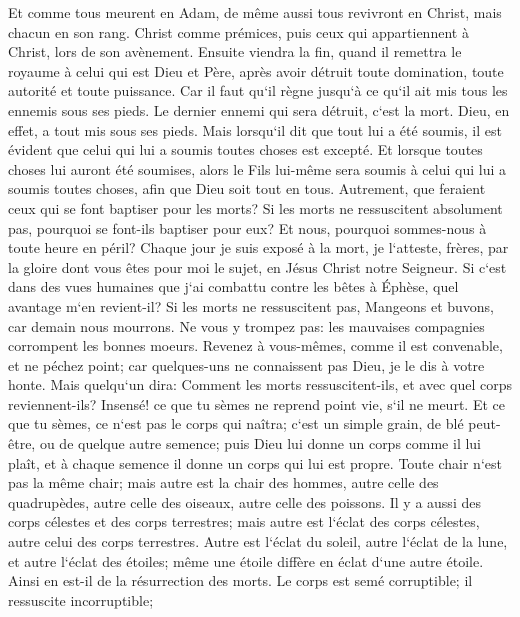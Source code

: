 \verse Et comme tous meurent en Adam, de même aussi tous revivront en Christ, 
\verse mais chacun en son rang. Christ comme prémices, puis ceux qui appartiennent à Christ, lors de son avènement. 
\verse Ensuite viendra la fin, quand il remettra le royaume à celui qui est Dieu et Père, après avoir détruit toute domination, toute autorité et toute puissance. 
\verse Car il faut qu`il règne jusqu`à ce qu`il ait mis tous les ennemis sous ses pieds. 
\verse Le dernier ennemi qui sera détruit, c`est la mort. 
\verse Dieu, en effet, a tout mis sous ses pieds. Mais lorsqu`il dit que tout lui a été soumis, il est évident que celui qui lui a soumis toutes choses est excepté. 
\verse Et lorsque toutes choses lui auront été soumises, alors le Fils lui-même sera soumis à celui qui lui a soumis toutes choses, afin que Dieu soit tout en tous. 
\verse Autrement, que feraient ceux qui se font baptiser pour les morts? Si les morts ne ressuscitent absolument pas, pourquoi se font-ils baptiser pour eux? 
\verse Et nous, pourquoi sommes-nous à toute heure en péril? 
\verse Chaque jour je suis exposé à la mort, je l`atteste, frères, par la gloire dont vous êtes pour moi le sujet, en Jésus Christ notre Seigneur. 
\verse Si c`est dans des vues humaines que j`ai combattu contre les bêtes à Éphèse, quel avantage m`en revient-il? Si les morts ne ressuscitent pas, Mangeons et buvons, car demain nous mourrons. 
\verse Ne vous y trompez pas: les mauvaises compagnies corrompent les bonnes moeurs. 
\verse Revenez à vous-mêmes, comme il est convenable, et ne péchez point; car quelques-uns ne connaissent pas Dieu, je le dis à votre honte. 
\verse Mais quelqu`un dira: Comment les morts ressuscitent-ils, et avec quel corps reviennent-ils? 
\verse Insensé! ce que tu sèmes ne reprend point vie, s`il ne meurt. 
\verse Et ce que tu sèmes, ce n`est pas le corps qui naîtra; c`est un simple grain, de blé peut-être, ou de quelque autre semence; 
\verse puis Dieu lui donne un corps comme il lui plaît, et à chaque semence il donne un corps qui lui est propre. 
\verse Toute chair n`est pas la même chair; mais autre est la chair des hommes, autre celle des quadrupèdes, autre celle des oiseaux, autre celle des poissons. 
\verse Il y a aussi des corps célestes et des corps terrestres; mais autre est l`éclat des corps célestes, autre celui des corps terrestres. 
\verse Autre est l`éclat du soleil, autre l`éclat de la lune, et autre l`éclat des étoiles; même une étoile diffère en éclat d`une autre étoile. 
\verse Ainsi en est-il de la résurrection des morts. Le corps est semé corruptible; il ressuscite incorruptible; 
